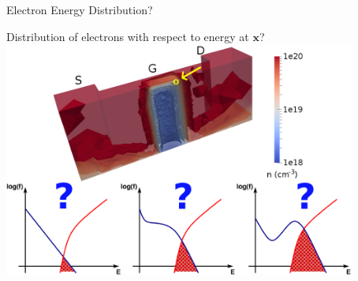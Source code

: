 \documentclass[usepdftitle=false,handout,10pt]{beamer}
\renewcommand{\vector}[1]{\boldsymbol{#1}}
\begin{document}
% 
%   
%  
%  
% 
%  
%  
%  
\begin{frame} {Electron Energy Distribution?} 
 \begin{center}Distribution of electrons with respect to energy at $\vector x$? \\ 
  \includegraphics[width=0.87\textwidth]{trigate-electrons-edf-3}
 \end{center} 
\end{frame} 
 
\end{document}
